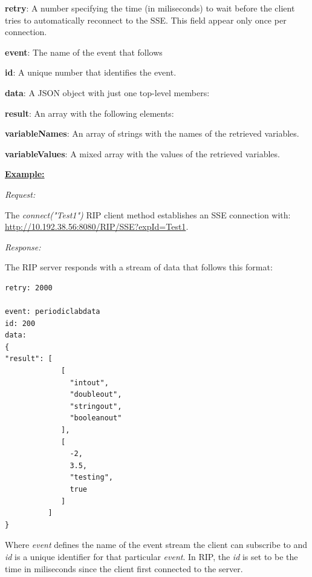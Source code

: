 \begin{myEnumerate}
    \item \textbf{retry}: A number specifying the time (in miliseconds) to wait before the client tries to automatically reconnect to the SSE. This field appear only once per connection.
    \item \textbf{event}: The name of the event that follows
    \item \textbf{id}: A unique number that identifies the event.
    \item \textbf{data}: A JSON object with just one top-level members:
    \begin{myEnumerate}
        \item \textbf{result}: An array with the following elements:
        \begin{myEnumerate}
            \item \textbf{variableNames}: An array of strings with the names of the retrieved variables.
            \item \textbf{variableValues}: A mixed array with the values of the retrieved variables.
        \end{myEnumerate}
    \end{myEnumerate}
\end{myEnumerate}

\textbf{\underline{Example:}}

\textit{Request:}

The \textit{connect("Test1")} RIP client method establishes an SSE connection with: \url{http://10.192.38.56:8080/RIP/SSE?expId=Test1}.

\textit{Response:}

The RIP server responds with a stream of data that follows this format:

\begin{lstlisting}
retry: 2000

event: periodiclabdata
id: 200
data: 
{
"result": [
             [
               "intout",
               "doubleout",
               "stringout",
               "booleanout"
             ],
             [
               -2,
               3.5,
               "testing",
               true
             ]
          ]
}
\end{lstlisting}

Where \textit{event} defines the name of the event stream the client can subscribe to and \textit{id} is a unique identifier for that particular \textit{event}. In RIP, the \textit{id} is set to be the time in miliseconds since the client first connected to the server.

